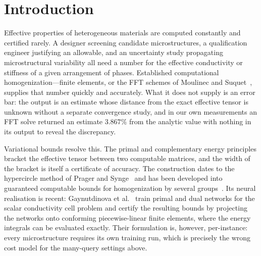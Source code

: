 
\section{Introduction}
\label{sec:intro}

Effective properties of heterogeneous materials are computed constantly and
certified rarely. A designer screening candidate microstructures, a
qualification engineer justifying an allowable, and an uncertainty study
propagating microstructural variability all need a number for the effective
conductivity or stiffness of a given arrangement of phases. Established
computational homogenization---finite elements, or the FFT schemes of
Moulinec and Suquet~\cite{Moulinec1998}, supplies that number quickly and
accurately. What it does not supply is an error bar: the output is an
estimate whose distance from the exact effective tensor is unknown without
a separate convergence study, and in our own measurements an FFT solve
returned an estimate $3.867\%$ from the analytic value with nothing in its
output to reveal the discrepancy.

Variational bounds resolve this. The primal and complementary energy
principles bracket the effective tensor between two computable matrices,
and the width of the bracket is itself a certificate of accuracy. The
construction dates to the hypercircle method of Prager and
Synge~\cite{PragerSynge1947} and has been developed into guaranteed
computable bounds for homogenization by several
groups~\cite{Vondrejc2015,Vondrejc2016,Gaynutdinova2023}.
Its neural realisation is recent: Gaynutdinova et
al.~\cite{Gaynutdinova2026} train primal and dual networks for the scalar
conductivity cell problem and certify the resulting bounds by projecting
the networks onto conforming piecewise-linear finite elements, where the
energy integrals can be evaluated exactly. Their formulation is, however,
per-instance: every microstructure requires its own training run, which is
precisely the wrong cost model for the many-query settings above.

